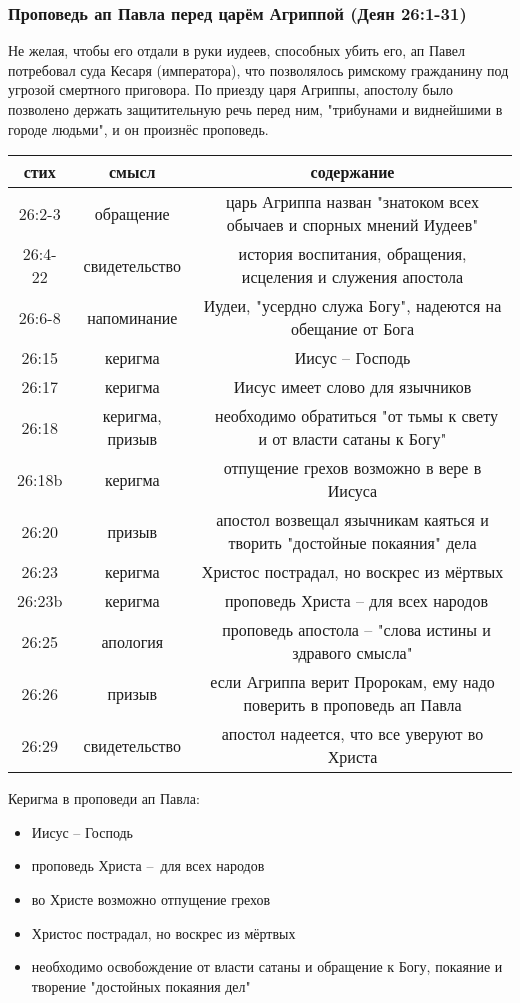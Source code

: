 \subsubsection*{Проповедь ап Павла перед царём Агриппой (Деян 26:1-31)}
Не желая, чтобы его отдали в руки иудеев, способных убить его, ап Павел потребовал суда Кесаря (императора), что позволялось римскому гражданину под угрозой смертного приговора.
По приезду царя Агриппы, апостолу было позволено держать защитительную речь перед ним, "трибунами и виднейшими в городе людьми", и он произнёс проповедь. 

\begin{center}
	\begin{tabular}{ |c|c|c| }
		\hline
		стих & смысл & содержание \\
		\hline\hline
		26:2-3 & обращение & царь Агриппа назван "знатоком всех обычаев и спорных мнений Иудеев" \\
		26:4-22 & свидетельство & история воспитания, обращения, исцеления и служения апостола \\
		26:6-8 & напоминание & Иудеи, "усердно служа Богу", надеются на обещание от Бога \\
		26:15 & керигма & Иисус – Господь \\
		26:17 & керигма & Иисус имеет слово для язычников \\
		26:18 & керигма, призыв & необходимо обратиться "от тьмы к свету и от власти сатаны к Богу" \\
		26:18b & керигма & отпущение грехов возможно в вере в Иисуса \\
		26:20 & призыв & апостол возвещал язычникам каяться и творить "достойные покаяния" дела \\
		26:23 & керигма & Христос пострадал, но воскрес из мёртвых \\
		26:23b & керигма & проповедь Христа – для всех народов \\
		26:25 & апология & проповедь апостола – "слова истины и здравого смысла" \\
		26:26 & призыв & если Агриппа верит Пророкам, ему надо поверить в проповедь ап Павла \\
		26:29 & свидетельство & апостол надеется, что все уверуют во Христа \\
		\hline
	\end{tabular}
\end{center}

Керигма в проповеди ап Павла:
\begin{itemize}
	\item Иисус – Господь
	\item проповедь Христа – для всех народов
	\item во Христе возможно отпущение грехов
	\item Христос пострадал, но воскрес из мёртвых
	\item необходимо освобождение от власти сатаны и обращение к Богу, покаяние и творение "достойных покаяния дел"
\end{itemize}

